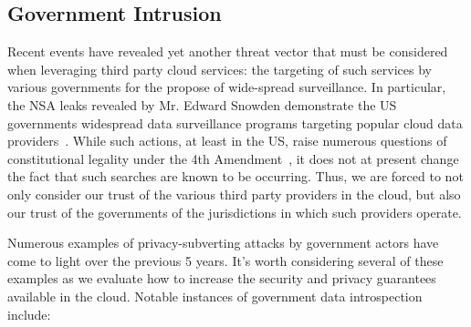 \subsection{Government Intrusion}

Recent events have revealed yet another threat vector that must be
considered when leveraging third party cloud services: the targeting
of such services by various governments for the propose of wide-spread
surveillance. In particular, the NSA leaks revealed by Mr. Edward
Snowden demonstrate the US governments widespread data surveillance
programs targeting popular cloud data
providers~\cite{greenwald-prism}. While such actions, at least in the
US, raise numerous questions of constitutional legality under the 4th
Amendment~\cite{us-constitution-amend4}, it does not at present change
the fact that such searches are known to be occurring. Thus, we are
forced to not only consider our trust of the various third party
providers in the cloud, but also our trust of the governments of the
jurisdictions in which such providers operate.

Numerous examples of privacy-subverting attacks by government actors
have come to light over the previous 5 years. It's worth considering
several of these examples as we evaluate how to increase the security
and privacy guarantees available in the cloud. Notable instances of
government data introspection include:

